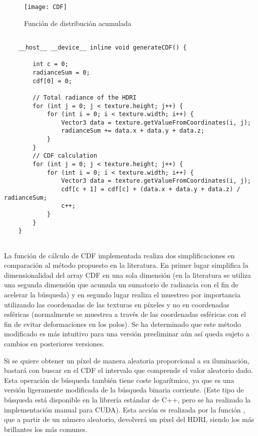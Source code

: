 \begin{figure}[H]
    \centering
	\texttt{[image: CDF]}
	\caption{Función de distribución acumulada}
	\label{fig:CDF}
\end{figure}


\begin{lstlisting}
	
	__host__ __device__ inline void generateCDF() {

		int c = 0;
		radianceSum = 0;
		cdf[0] = 0;

		// Total radiance of the HDRI
		for (int j = 0; j < texture.height; j++) {
			for (int i = 0; i < texture.width; i++) {
				Vector3 data = texture.getValueFromCoordinates(i, j);
				radianceSum += data.x + data.y + data.z;
			}
		}
		// CDF calculation
		for (int j = 0; j < texture.height; j++) {
			for (int i = 0; i < texture.width; i++) {
				Vector3 data = texture.getValueFromCoordinates(i, j);
				cdf[c + 1] = cdf[c] + (data.x + data.y + data.z) / radianceSum;
				c++;
			}
		}
	}
	
\end{lstlisting}

La función de cálculo de CDF implementada realiza dos simplificaciones en comparación al método propuesto en la literatura. En primer lugar simplifica la dimensionalidad del array CDF en una sola dimensión (en la literatura se utiliza una segunda dimensión que acumula un sumatorio de radiancia con el fin de acelerar la búsqueda) y en segundo lugar realiza el muestreo por importancia utilizando las coordenadas de las texturas en píxeles y no en coordenadas esféricas (normalmente se muestrea a través de las coordenadas esféricas con el fin de evitar deformaciones en los polos). Se ha determinado que este método modificado es más intuitivo para una versión preeliminar aún así queda sujeto a cambios en posteriores versiones. 

Si se quiere obtener un píxel de manera aleatoria proporcional a su iluminación, bastará con buscar en el CDF el intervalo que comprende el valor aleatorio dado. Esta operación de búsqueda también tiene coste logarítmico, ya que es una versión ligeramente modificada de la búsqueda binaria corriente. (Este tipo de búsqueda está disponible en la librería estándar de C++,  pero se ha realizado la implementación manual para CUDA). Esta acción es realizada por la función , que a partir de un número aleatorio, devolverá un píxel del HDRI, siendo los más brillantes los más comunes.

